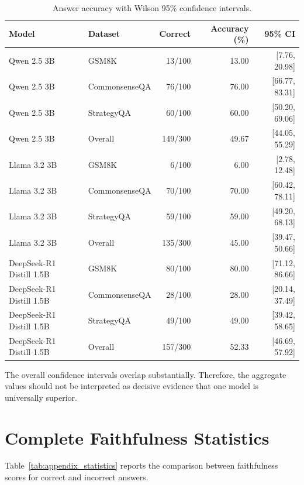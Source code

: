 \begin{table}[t]
\centering
\small
\caption{Answer accuracy with Wilson 95\% confidence intervals.}
\label{tab:appendix_accuracy}
\begin{tabular}{llrrr}
\toprule
\textbf{Model} &
\textbf{Dataset} &
\textbf{Correct} &
\textbf{Accuracy (\%)} &
\textbf{95\% CI} \\
\midrule
Qwen 2.5 3B & GSM8K & 13/100 & 13.00 & [7.76, 20.98] \\
Qwen 2.5 3B & CommonsenseQA & 76/100 & 76.00 & [66.77, 83.31] \\
Qwen 2.5 3B & StrategyQA & 60/100 & 60.00 & [50.20, 69.06] \\
Qwen 2.5 3B & Overall & 149/300 & 49.67 & [44.05, 55.29] \\
\midrule
Llama 3.2 3B & GSM8K & 6/100 & 6.00 & [2.78, 12.48] \\
Llama 3.2 3B & CommonsenseQA & 70/100 & 70.00 & [60.42, 78.11] \\
Llama 3.2 3B & StrategyQA & 59/100 & 59.00 & [49.20, 68.13] \\
Llama 3.2 3B & Overall & 135/300 & 45.00 & [39.47, 50.66] \\
\midrule
DeepSeek-R1 Distill 1.5B & GSM8K & 80/100 & 80.00 & [71.12, 86.66] \\
DeepSeek-R1 Distill 1.5B & CommonsenseQA & 28/100 & 28.00 & [20.14, 37.49] \\
DeepSeek-R1 Distill 1.5B & StrategyQA & 49/100 & 49.00 & [39.42, 58.65] \\
DeepSeek-R1 Distill 1.5B & Overall & 157/300 & 52.33 & [46.69, 57.92] \\
\bottomrule
\end{tabular}
\end{table}

The overall confidence intervals overlap substantially. Therefore, the
aggregate values should not be interpreted as decisive evidence that one model
is universally superior.

\section{Complete Faithfulness Statistics}
\label{app:statistics}

Table~\ref{tab:appendix_statistics} reports the comparison between
faithfulness scores for correct and incorrect answers.

